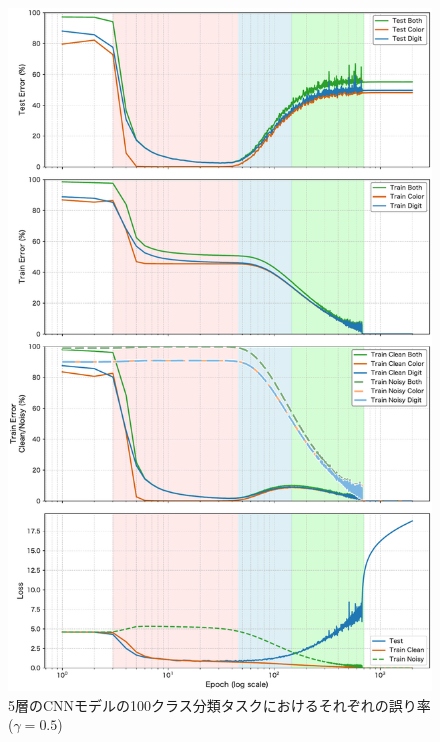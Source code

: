 \begin{figure}[H]
    \centering
    \begin{minipage}[t]{0.48\linewidth}
        \centering
        \includegraphics[width=\linewidth]{fig/layer_comparison/cnn5_error_comp_layer.pdf}
        \caption{5層のCNNモデルの100クラス分類タスクにおけるそれぞれの誤り率($\gamma = 0.5$)}
        \label{fig:5layer_results}
    \end{minipage}
    \hfill
    \begin{minipage}[t]{0.48\linewidth}
        \centering

\end{minipage}
\end{figure}
